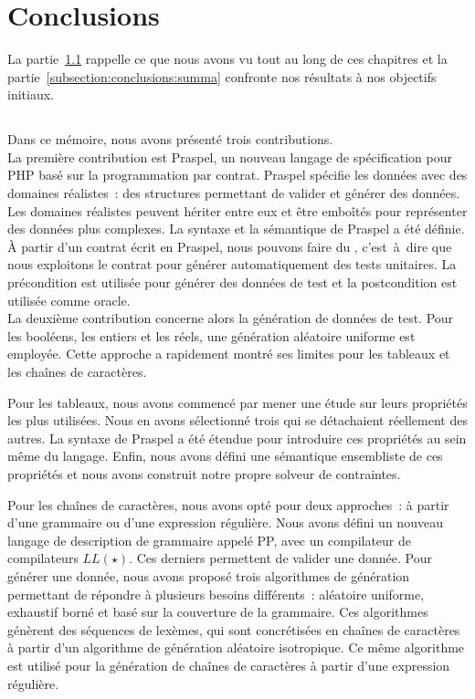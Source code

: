 \section{Conclusions}
\label{section:conclusions:conclusions}

La partie~\ref{subsection:conclusions:recapitulare} rappelle ce que nous avons
vu tout au long de ces chapitres et la partie~\ref{subsection:conclusions:summa}
confronte nos résultats à nos objectifs initiaux.

\subsection{}
\label{subsection:conclusions:recapitulare}

Dans ce mémoire, nous avons présenté trois contributions. \\

La première contribution est Praspel, un nouveau langage de spécification pour
PHP basé sur la programmation par contrat. Praspel spécifie les données avec des
domaines réalistes~: des structures permettant de valider et générer des
données. Les domaines réalistes peuvent hériter entre eux et être emboîtés pour
représenter des données plus complexes. La syntaxe et la sémantique de Praspel a
été définie.  À partir d'un contrat écrit en Praspel, nous pouvons faire du
, c'est~à~dire que nous exploitons le contrat
pour générer automatiquement des tests unitaires. La précondition est utilisée
pour générer des données de test et la postcondition est utilisée comme oracle.
\\

La deuxième contribution concerne alors la génération de données de test. Pour
les booléens, les entiers et les réels, une génération aléatoire uniforme est
employée. Cette approche a rapidement montré ses limites pour les tableaux et
les chaînes de caractères.

Pour les tableaux, nous avons commencé par mener une étude sur leurs propriétés
les plus utilisées. Nous en avons sélectionné trois qui se détachaient
réellement des autres. La syntaxe de Praspel a été étendue pour introduire ces
propriétés au sein même du langage. Enfin, nous avons défini une sémantique
ensembliste de ces propriétés et nous avons construit notre propre solveur de
contraintes.

Pour les chaînes de caractères, nous avons opté pour deux approches~: à partir
d'une grammaire ou d'une expression régulière. Nous avons défini un nouveau
langage de description de grammaire appelé PP, avec un compilateur de
compilateurs $LL(\star)$. Ces derniers permettent de valider une donnée. Pour
générer une donnée, nous avons proposé trois algorithmes de génération
permettant de répondre à plusieurs besoins différents~: aléatoire uniforme,
exhaustif borné et basé sur la couverture de la grammaire. Ces algorithmes
génèrent des séquences de lexèmes, qui sont concrétisées en chaînes de
caractères à partir d'un algorithme de génération aléatoire isotropique. Ce même
algorithme est utilisé pour la génération de chaînes de caractères à partir
d'une expression régulière.

